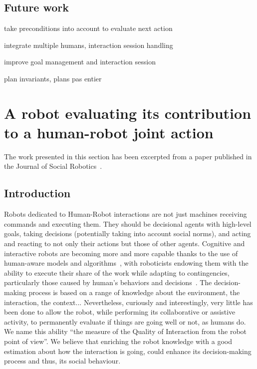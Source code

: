 \documentclass[a4paper,11pt,twoside]{StyleThese}
\begin{document}
\subsection{Future work}
take preconditions into account to evaluate next action

integrate multiple humans, interaction session handling

improve goal management and interaction session

plan invariants, plans pas entier
 

\section{A robot evaluating its contribution to a human-robot joint action}\label{chap2:sec:qoi}

The work presented in this section has been excerpted from a paper published in the Journal of Social Robotics~\cite{mayima_2021_towards}.

\subsection{Introduction}

Robots dedicated to Human-Robot interactions are not just machines receiving commands and executing them. They should be decisional agents with high-level goals, taking decisions (potentially taking into account social norms), and acting and reacting to not only their actions but those of other agents. Cognitive and interactive robots are becoming more and more capable thanks to the use of human-aware models and algorithms~\cite{kruse2013,thomaz_2016_computational}, with roboticists endowing them with the ability to execute their share of the work while adapting to contingencies, particularly those caused by human's behaviors and decisions~\cite{hoffman_2007_fluency,cakmak_2017,lemaignan_2017_artificial}. The decision-making process is based on a range of knowledge about the environment, the interaction, the context... Nevertheless, curiously and interestingly, very little has been done to allow the robot, while performing its collaborative or assistive activity, to permanently evaluate if things are going well or not, as humans do. We name this ability ``the measure of the Quality of Interaction from the robot point of view''. We believe that enriching the robot knowledge with a good estimation about how the interaction is going, could enhance its decision-making process and thus, its social behaviour.
\end{document}
